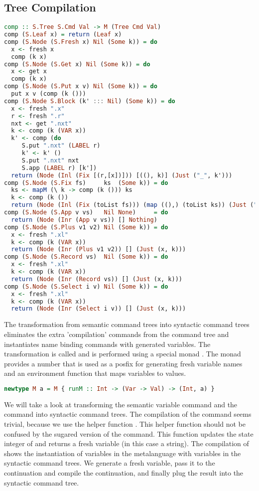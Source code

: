 
\subsection{\label{subsection:semtosyn}Tree Compilation}
\begin{lstlisting}[language=Haskell]
comp :: S.Tree S.Cmd Val -> M (Tree Cmd Val)
comp (S.Leaf x) = return (Leaf x)
comp (S.Node (S.Fresh x) Nil (Some k)) = do
  x <- fresh x
  comp (k x)
comp (S.Node (S.Get x) Nil (Some k)) = do
  x <- get x
  comp (k x)
comp (S.Node (S.Put x v) Nil (Some k)) = do
  put x v (comp (k ()))
comp (S.Node S.Block (k' ::: Nil) (Some k)) = do
  x <- fresh ".x"
  r <- fresh ".r"
  nxt <- get ".nxt"
  k <- comp (k (VAR x))
  k' <- comp (do
     S.put ".nxt" (LABEL r)
     k' <- k' ()
     S.put ".nxt" nxt
     S.app (LABEL r) [k'])
  return (Node (Inl (Fix [(r,[x])])) [((), k)] (Just ("_", k')))
comp (S.Node (S.Fix fs)     ks  (Some k)) = do
  ks <- mapM (\ k -> comp (k ())) ks
  k <- comp (k ())
  return (Node (Inl (Fix (toList fs))) (map ((),) (toList ks)) (Just ("_", k)))
comp (S.Node (S.App v vs)   Nil None)     = do
  return (Node (Inr (App v vs)) [] Nothing)
comp (S.Node (S.Plus v1 v2) Nil (Some k)) = do
  x <- fresh ".xl"
  k <- comp (k (VAR x))
  return (Node (Inr (Plus v1 v2)) [] (Just (x, k)))
comp (S.Node (S.Record vs)  Nil (Some k)) = do
  x <- fresh ".xl"
  k <- comp (k (VAR x))
  return (Node (Inr (Record vs)) [] (Just (x, k)))
comp (S.Node (S.Select i v) Nil (Some k)) = do
  x <- fresh ".xl"
  k <- comp (k (VAR x))
  return (Node (Inr (Select i v)) [] (Just (x, k)))
\end{lstlisting}

The transformation from semantic command trees into syntactic command trees eliminates the extra 'compilation' commands from the command tree and instantiates name binding commands with generated variables. The transformation is called  and is performed using a special monad . The monad  provides a number that is used as a posfix for generating fresh variable names and an environment function that maps variables to values. 

\begin{lstlisting}[language=Haskell]
newtype M a = M { runM :: Int -> (Var -> Val) -> (Int, a) }
\end{lstlisting}

We will take a look at transforming the semantic  variable command and the  command into syntactic command trees. The compilation of the  command seems trivial, because we use the helper function . This helper function should not be confused by the sugared version of the  command. This function updates the state integer of  and returns a fresh variable (in this case a string). The compilation of  shows the instantiation of variables in the metalanguage with variables in the syntactic command trees. We generate a fresh variable, pass it to the continuation and compile the continuation, and finally plug the result into the syntactic command tree.

